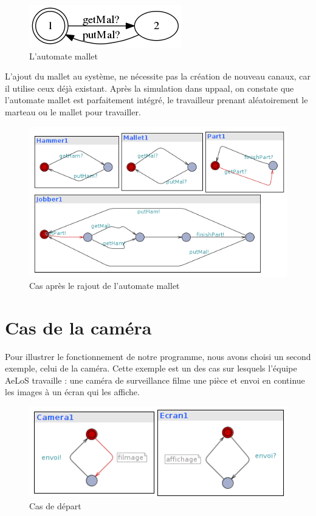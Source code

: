 \documentclass[12pt,a4paper]{report}
\begin{document}
\begin{figure}[H]
  \centering
  \includegraphics[scale=0.6]{ressources/mallet.png}
  \caption{L'automate mallet}
\end{figure}    

    L'ajout du mallet au système, ne nécessite pas la création de nouveau canaux, car il utilise ceux déjà existant. Après la simulation dans uppaal, on constate que l'automate mallet est parfaitement intégré, le travailleur prenant aléatoirement le marteau ou le mallet pour travailler.

\begin{figure}[H]
  \centering
  \includegraphics[scale=0.6]{ressources/workerMallet.png}
  \caption{Cas après le rajout de l'automate mallet}
\end{figure}  

\newpage    
    \section{Cas de la caméra}

    Pour illustrer le fonctionnement de notre programme, nous avons choisi un second exemple, celui de la caméra. Cette exemple est un des cas sur lesquels l'équipe AeLoS travaille : une caméra de surveillance filme une pièce et envoi en continue les images à un écran qui les affiche.
    
\begin{figure}[H]
  \centering
  \includegraphics[scale=0.6]{ressources/cameraBasic.png}
  \caption{Cas de départ}
\end{figure}       
\end{document}
